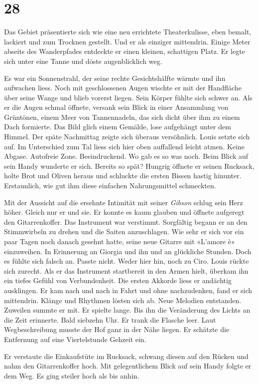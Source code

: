\chapter{28}



Das Gebiet präsentierte sich wie eine neu errichtete Theaterkulisse, 
eben bemalt, lackiert und zum Trocknen gestellt. Und er als einziger
mittendrin. Einige Meter abseits des Wanderpfades entdeckte er einen
kleinen, schattigen Platz. Er legte sich unter eine Tanne und döste
augenblicklich weg.

Es war ein Sonnenstrahl, der seine rechte Gesichtshälfte wärmte und
ihn aufwachen liess. Noch mit geschlossenen Augen wischte er mit der
Handfläche über seine Wange und blieb vorerst liegen. Sein Körper
fühlte sich schwer an.
Als er die Augen schmal öffnete, versank sein Blick in einer Ansammlung
von Grüntönen, einem Meer von Tannennadeln, das sich dicht über ihm zu einem
Dach formierte. Das Bild glich einem Gemälde, lose aufgehängt unter dem 
Himmel. Der späte Nachmittag zeigte sich überaus versöhnlich. Louis setzte sich auf. Im
Unterschied zum Tal liess sich hier oben auffallend leicht atmen. Keine
Abgase. Autofreie Zone. Beeindruckend. Wo gab es so was noch.
Beim Blick auf sein Handy wunderte er sich. Bereits so spät? Hungrig öffnete er seinen Rucksack, holte Brot und
Oliven heraus und schluckte die ersten Bissen hastig hinunter.
Erstaunlich, wie gut ihm diese einfachen Nahrungsmittel schmeckten. 

Mit der Aussicht auf die ersehnte Intimität mit seiner \emph{Gibson}
schlug sein Herz höher. Gleich nur er und sie. Er konnte es kaum glauben 
und öffnete aufgeregt den Gitarrenkoffer. 
Das Instrument war verstimmt. Sorgfältig begann er an den Stimmwirbeln
zu drehen und die Saiten anzuschlagen. 
Wie sehr er sich vor ein paar Tagen noch danach gesehnt hatte, seine
neue Gitarre mit «L’amore è» einzuweihen. In Erinnerung an
Giorgia und ihn und an glückliche Stunden. Doch es fühlte sich falsch
an. Passte nicht. Weder hier hin, noch zu Ciro.
Louis rückte sich zurecht. Als er das Instrument startbereit in den Armen hielt,
überkam ihn ein tiefes Gefühl von Verbundenheit. Die ersten Akkorde liess er andächtig ausklingen. Er kam nach und nach in
Fahrt und ohne nachzudenken, fand er sich mittendrin. Klänge und
Rhythmen lösten sich ab. Neue Melodien entstanden. Zuweilen summte er mit. Er spielte lange.
Bis ihn die Veränderung des Lichts an die Zeit erinnerte. Bald siebzehn
Uhr. Er trank die Flasche leer.
Laut Wegbeschreibung musste der Hof ganz in der Nähe liegen. Er schätzte 
die Entfernung auf eine Viertelstunde Gehzeit ein.

Er verstaute die Einkaufstüte im Rucksack, schwang diesen auf den Rücken und nahm den Gitarrenkoffer hoch. 
Mit gelegentlichem Blick auf sein Handy folgte er dem Weg. Es ging
steiler hoch als bis anhin. 